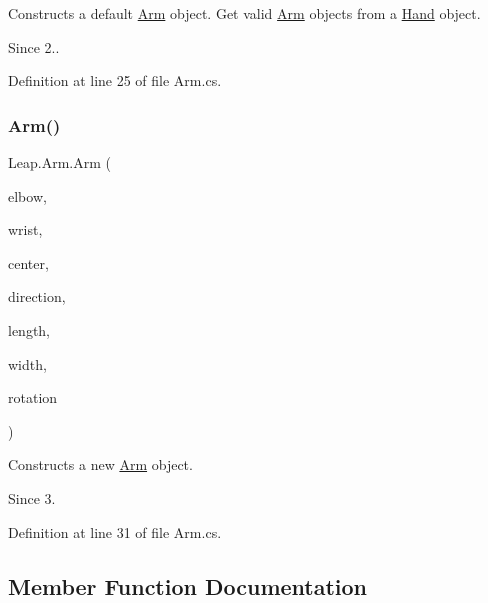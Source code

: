 Constructs a default \mbox{\hyperlink{class_leap_1_1_arm}{Arm}} object. Get valid \mbox{\hyperlink{class_leap_1_1_arm}{Arm}} objects from a \mbox{\hyperlink{class_leap_1_1_hand}{Hand}} object. 

\begin{DoxySince}{Since}
2.. 
\end{DoxySince}


Definition at line 25 of file Arm.\+cs.

\mbox{\label{class_leap_1_1_arm_a701ad9cfa92cdfdf206aaf5a43eaac43}} 
\subsubsection{\texorpdfstring{Arm()}{Arm()}\hspace{0.1cm}{\footnotesize\ttfamily [2/2]}}
{\footnotesize\ttfamily Leap.\+Arm.\+Arm (\begin{DoxyParamCaption}\item[{\mbox{\hyperlink{struct_leap_1_1_vector}{Vector}}}]{elbow,  }\item[{\mbox{\hyperlink{struct_leap_1_1_vector}{Vector}}}]{wrist,  }\item[{\mbox{\hyperlink{struct_leap_1_1_vector}{Vector}}}]{center,  }\item[{\mbox{\hyperlink{struct_leap_1_1_vector}{Vector}}}]{direction,  }\item[{float}]{length,  }\item[{float}]{width,  }\item[{\mbox{\hyperlink{struct_leap_1_1_leap_quaternion}{Leap\+Quaternion}}}]{rotation }\end{DoxyParamCaption})}



Constructs a new \mbox{\hyperlink{class_leap_1_1_arm}{Arm}} object. 

\begin{DoxySince}{Since}
3. 
\end{DoxySince}


Definition at line 31 of file Arm.\+cs.



\subsection{Member Function Documentation}
\mbox{\label{class_leap_1_1_arm_af18280f081e936d19487322bfdbe9134}} 
